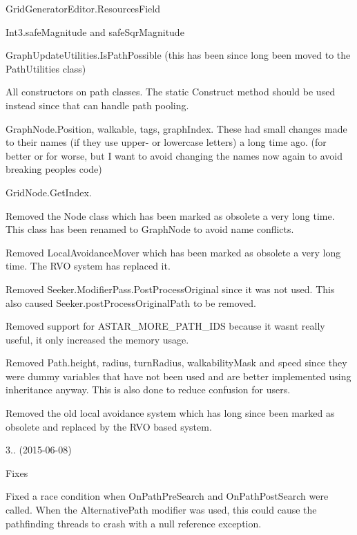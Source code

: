 \begin{DoxyItemize}
\begin{DoxyItemize}
\begin{DoxyItemize}
\begin{DoxyItemize}
\item Grid\+Generator\+Editor.\+Resources\+Field
\item Int3.\+safe\+Magnitude and safe\+Sqr\+Magnitude
\item Graph\+Update\+Utilities.\+Is\+Path\+Possible (this has been since long been moved to the Path\+Utilities class)
\item All constructors on path classes. The static Construct method should be used instead since that can handle path pooling.
\item Graph\+Node.\+Position, walkable, tags, graph\+Index. These had small changes made to their names (if they use upper-\/ or lowercase letters) a long time ago. (for better or for worse, but I want to avoid changing the names now again to avoid breaking peoples\textquotesingle{} code)
\item Grid\+Node.\+Get\+Index.
\end{DoxyItemize}
\item Removed the Node class which has been marked as obsolete a very long time. This class has been renamed to Graph\+Node to avoid name conflicts.
\item Removed Local\+Avoidance\+Mover which has been marked as obsolete a very long time. The R\+VO system has replaced it.
\item Removed Seeker.\+Modifier\+Pass.\+Post\+Process\+Original since it was not used. This also caused Seeker.\+post\+Process\+Original\+Path to be removed.
\item Removed support for A\+S\+T\+A\+R\+\_\+\+M\+O\+R\+E\+\_\+\+P\+A\+T\+H\+\_\+\+I\+DS because it wasn\textquotesingle{}t really useful, it only increased the memory usage.
\item Removed Path.\+height, radius, turn\+Radius, walkability\+Mask and speed since they were dummy variables that have not been used and are better implemented using inheritance anyway. This is also done to reduce confusion for users.
\item Removed the old local avoidance system which has long since been marked as obsolete and replaced by the R\+VO based system.
\end{DoxyItemize}
\end{DoxyItemize}
\item 3.. (2015-\/06-\/08)
\begin{DoxyItemize}
\item Fixes
\begin{DoxyItemize}
\item Fixed a race condition when On\+Path\+Pre\+Search and On\+Path\+Post\+Search were called. When the Alternative\+Path modifier was used, this could cause the pathfinding threads to crash with a null reference exception.

\end{DoxyItemize}
\end{DoxyItemize}
\end{DoxyItemize}
